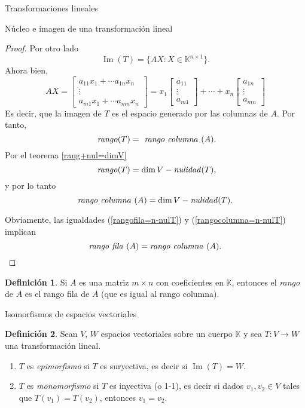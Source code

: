 \documentclass[a4paper,12pt,twoside,spanish]{amsbook}
\theoremstyle{definition}
\newtheorem{definicion}{Definici\'on}[section]
\theoremstyle{remark}
\newcommand{\img}{\operatorname{Im}}
\newcommand{\K}{\mathbb K}
\begin{document}
\begin{chapter}{Transformaciones lineales}
\begin{section}{Núcleo e imagen de una transformación lineal}
\begin{proof}
			Por otro lado 
			$$
			\img(T) = \{AX: X \in \K^{n \times 1} \}.
			$$
			Ahora bien, 
			$$
			AX = 
			\begin{bmatrix} a_{11} x_1 +\cdots a_{1n} x_n \\ \vdots \\ a_{m1} x_1 +\cdots a_{mn} x_n  \end{bmatrix}
			= 
			x_1\begin{bmatrix} a_{11} \\ \vdots \\ a_{m1} \end{bmatrix} + \cdots +
			x_n\begin{bmatrix}  a_{1n}  \\ \vdots \\ a_{mn}  \end{bmatrix}
			$$
			Es decir, que la imagen de $T$ es el espacio generado por las columnas de $A$. Por tanto,
			$$
			\text{\textit{ rango}}(T) =\text{\textit{ rango  columna }}(A).
			$$
			Por  el  teorema \ref{rang+nul=dimV}
			$$
			\text{\textit{ rango}}(T) = \dim V - \text{\textit{nulidad}}(T),
			$$
			y por lo tanto
			\begin{equation}\label{rangocolumna=n-nulT}
			\text{\textit{rango columna }} (A) = \dim V - \text{\textit{nulidad}}(T). 
			\end{equation}
			
			Obviamente, las igualdades (\ref{rangofila=n-nulT}) y (\ref{rangocolumna=n-nulT}) implican 
			$$
		\text{\textit{rango fila }} (A) = \text{\textit{rango  columna }} (A).
		$$
		\end{proof}
	
		\begin{definicion}
				Si $A$ es una matriz $m \times n$ con coeficientes  en $\K$,  entonces el \textit{rango} de $A$ es el rango fila de $A$ (que es igual al rango columna).
		\end{definicion}
		
		\end{section}
	
		\begin{section}{Isomorfismos de espacios vectoriales}
		
		\begin{definicion}
			Sean $V$, $W$ espacios vectoriales sobre un cuerpo $\K$ y sea $T:V \to W$ una transformación lineal.
			\begin{enumerate}
				\item $T$  es \textit{epimorfismo} si $T$ es suryectiva, es decir si $\img(T) = W$.
				\item $T$ es \textit{monomorfismo} si $T$ es inyectiva (o 1-1),  es decir si dados $v_1,v_2 \in V$ tales que $T(v_1) = T(v_2)$,  entonces $v_1 = v_2$.
			\end{enumerate}  
		\end{definicion}
	

\end{section}
\end{chapter}
\end{document}
